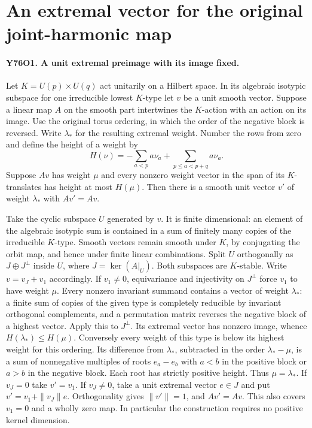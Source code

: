\section{An extremal vector for the original joint-harmonic map}

\paragraph{Y76O1. A unit extremal preimage with its image fixed.}
Let $K=U(p)\times U(q)$ act unitarily on a Hilbert space. In its
algebraic isotypic subspace for one irreducible lowest $K$-type
let $v$ be a unit smooth vector. Suppose a linear map $A$ on the
smooth part intertwines the $K$-action with an action on its image.
Use the original torus ordering, in which the order of the negative
block is reversed. Write $\lambda_*$ for the resulting extremal
weight. Number the rows from zero and define the height of a weight by
\[
       H(\nu)=-\sum_{a<p}a\nu_a+\sum_{p\le a<p+q}a\nu_a .
\]
Suppose $Av$ has weight $\mu$ and every nonzero weight vector
in the span of its $K$-translates has height at most $H(\mu)$.
Then there is a smooth unit vector $v'$ of weight $\lambda_*$
with $Av'=Av$.

Take the cyclic subspace $U$ generated by $v$. It is finite
dimensional: an element of the algebraic isotypic sum is contained
in a sum of finitely many copies of the irreducible $K$-type.
Smooth vectors remain smooth under $K$, by conjugating the orbit
map, and hence under finite linear combinations. Split $U$ orthogonally
as $J\oplus J^\perp$ inside $U$, where $J=\ker(A|_U)$.
Both subspaces are $K$-stable. Write $v=v_J+v_1$ accordingly.
If $v_1\ne0$, equivariance and injectivity on $J^\perp$ force
$v_1$ to have weight $\mu$. Every nonzero invariant summand
contains a vector of weight $\lambda_*$: a finite sum of copies
of the given type is completely reducible by invariant orthogonal
complements, and a permutation matrix reverses the negative
block of a highest vector. Apply this to $J^\perp$. Its extremal
vector has nonzero image, whence $H(\lambda_*)\le H(\mu)$.
Conversely every weight of this type is below its highest weight
for this ordering. Its difference from $\lambda_*$, subtracted
in the order $\lambda_*-\mu$, is a sum of nonnegative multiples
of roots $e_a-e_b$ with $a<b$ in the positive block or $a>b$
in the negative block. Each root has strictly positive height.
Thus $\mu=\lambda_*$. If $v_J=0$ take $v'=v_1$.
If $v_J\ne0$, take a unit extremal vector $e\in J$ and put
$v'=v_1+\|v_J\|e$. Orthogonality gives $\|v'\|=1$, and
$Av'=Av$. This also covers $v_1=0$ and a wholly zero map.
In particular the construction requires no positive kernel
dimension.

